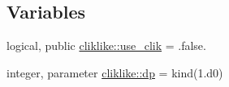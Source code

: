 \subsection*{Variables}
\begin{DoxyCompactItemize}
\item 
logical, public \mbox{\hyperlink{namespacecliklike_ab3a813fb756b21053772e9783f44ee73}{cliklike\+::use\+\_\+clik}} = .false.
\item 
integer, parameter \mbox{\hyperlink{namespacecliklike_a809e60ab23d53a4785481b88524bf355}{cliklike\+::dp}} = kind(1.d0)
\end{DoxyCompactItemize}
